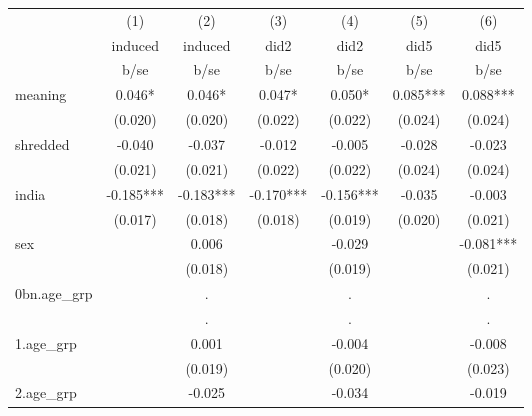 {
\def\sym#1{\ifmmode^{#1}\else\(^{#1}\)\fi}
\begin{tabular}{l*{6}{c}}
\hline\hline
            &\multicolumn{1}{c}{(1)}&\multicolumn{1}{c}{(2)}&\multicolumn{1}{c}{(3)}&\multicolumn{1}{c}{(4)}&\multicolumn{1}{c}{(5)}&\multicolumn{1}{c}{(6)}\\
            &\multicolumn{1}{c}{induced}&\multicolumn{1}{c}{induced}&\multicolumn{1}{c}{did2}&\multicolumn{1}{c}{did2}&\multicolumn{1}{c}{did5}&\multicolumn{1}{c}{did5}\\
            &        b/se   &        b/se   &        b/se   &        b/se   &        b/se   &        b/se   \\
\hline
meaning     &       0.046*  &       0.046*  &       0.047*  &       0.050*  &       0.085***&       0.088***\\
            &     (0.020)   &     (0.020)   &     (0.022)   &     (0.022)   &     (0.024)   &     (0.024)   \\
[1em]
shredded    &      -0.040   &      -0.037   &      -0.012   &      -0.005   &      -0.028   &      -0.023   \\
            &     (0.021)   &     (0.021)   &     (0.022)   &     (0.022)   &     (0.024)   &     (0.024)   \\
[1em]
india       &      -0.185***&      -0.183***&      -0.170***&      -0.156***&      -0.035   &      -0.003   \\
            &     (0.017)   &     (0.018)   &     (0.018)   &     (0.019)   &     (0.020)   &     (0.021)   \\
[1em]
sex         &               &       0.006   &               &      -0.029   &               &      -0.081***\\
            &               &     (0.018)   &               &     (0.019)   &               &     (0.021)   \\
[1em]
0bn.age\_grp &               &           .   &               &           .   &               &           .   \\
            &               &           .   &               &           .   &               &           .   \\
[1em]
1.age\_grp   &               &       0.001   &               &      -0.004   &               &      -0.008   \\
            &               &     (0.019)   &               &     (0.020)   &               &     (0.023)   \\
[1em]
2.age\_grp   &               &      -0.025   &               &      -0.034   &               &      -0.019   \\

\end{tabular}}
